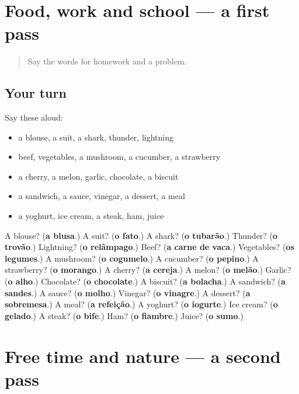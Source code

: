 \section[(dialogue)]{Food, work and school — a first pass}

\label{lesson:PT-R113-first-pass-food-work-and-school}



\begin{quote}
Say the words for homework and a problem.
\end{quote}

\subsection*{Your turn}
Say these aloud:

\begin{itemize}
\raggedright
  \item a blouse, a suit, a shark, thunder, lightning
  \item beef, vegetables, a mushroom, a cucumber, a strawberry
  \item a cherry, a melon, garlic, chocolate, a biscuit
  \item a sandwich, a sauce, vinegar, a dessert, a meal
  \item a yoghurt, ice cream, a steak, ham, juice
\end{itemize}

\begin{tcolorbox}[breakable,colback=teal!4,colframe=teal!35!black,title={Before you move on}]
A blouse? (\textbf{a blusa}.) A suit? (\textbf{o fato}.) A shark? (\textbf{o tubarão}.) Thunder? (\textbf{o trovão}.) Lightning? (\textbf{o relâmpago}.) Beef? (\textbf{a carne de vaca}.) Vegetables? (\textbf{os legumes}.) A mushroom? (\textbf{o cogumelo}.) A cucumber? (\textbf{o pepino}.) A strawberry? (\textbf{o morango}.) A cherry? (\textbf{a cereja}.) A melon? (\textbf{o melão}.) Garlic? (\textbf{o alho}.) Chocolate? (\textbf{o chocolate}.) A biscuit? (\textbf{a bolacha}.) A sandwich? (\textbf{a sandes}.) A sauce? (\textbf{o molho}.) Vinegar? (\textbf{o vinagre}.) A dessert? (\textbf{a sobremesa}.) A meal? (\textbf{a refeição}.) A yoghurt? (\textbf{o iogurte}.) Ice cream? (\textbf{o gelado}.) A steak? (\textbf{o bife}.) Ham? (\textbf{o fiambre}.) Juice? (\textbf{o sumo}.)
\end{tcolorbox}
\section[(dialogue)]{Free time and nature — a second pass}


